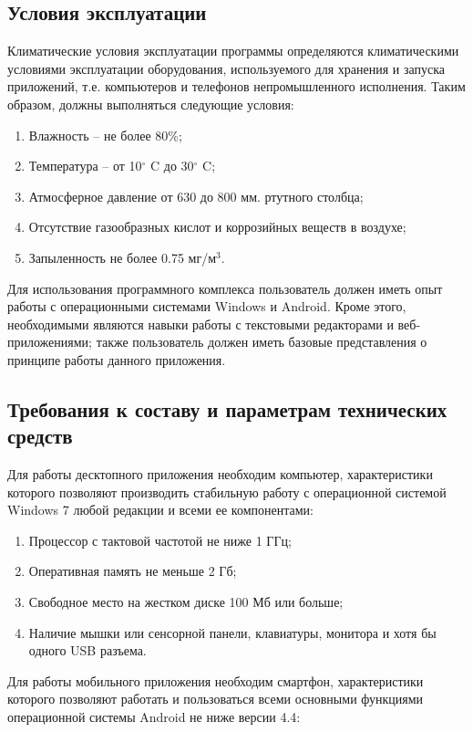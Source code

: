 ﻿\documentclass[techtask]{espd}
\begin{document}
\subsection{Условия эксплуатации}
Климатические условия эксплуатации программы определяются климатическими условиями эксплуатации оборудования, используемого для хранения и запуска приложений, т.е. компьютеров и телефонов непромышленного исполнения. Таким образом, должны выполняться следующие условия:

\begin{enumerate}
\item Влажность – не более 80\%;
\item Температура – от 10$^\circ$ C до 30$^\circ$ C;
\item Атмосферное давление от 630 до 800 мм. ртутного столбца;
\item Отсутствие газообразных кислот и коррозийных веществ в воздухе;
\item Запыленность не более 0.75 мг/м$^3$.
\end{enumerate}

Для использования программного комплекса пользователь должен иметь опыт работы с операционными системами Windows и Android. Кроме этого, необходимыми являются навыки работы с текстовыми редакторами и веб-приложениями; также пользователь должен иметь базовые представления о принципе работы данного приложения.

\subsection{Требования к составу и параметрам технических средств}
Для работы десктопного приложения необходим компьютер, характеристики которого позволяют производить стабильную работу с операционной системой Windows 7 любой редакции и всеми ее компонентами:

\begin{enumerate}
\item Процессор с тактовой частотой не ниже 1 ГГц;
\item Оперативная память не меньше 2 Гб;
\item Свободное место на жестком диске 100 Мб или больше;
\item Наличие мышки или сенсорной панели, клавиатуры, монитора и хотя бы одного USB разъема.
\end{enumerate}

Для работы мобильного приложения необходим смартфон, характеристики которого позволяют работать и пользоваться всеми основными функциями операционной системы Android не ниже версии 4.4: 
\end{document}
